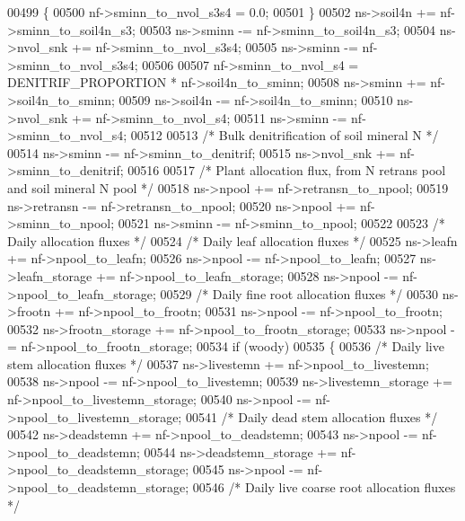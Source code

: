 \begin{DoxyCode}
{00499     \{
00500         nf->sminn\_to\_nvol\_s3s4 = 0.0;
00501     \}
00502     ns->soil4n     += nf->sminn\_to\_soil4n\_s3;
00503     ns->sminn      -= nf->sminn\_to\_soil4n\_s3;
00504     ns->nvol\_snk   += nf->sminn\_to\_nvol\_s3s4;
00505     ns->sminn      -= nf->sminn\_to\_nvol\_s3s4;
00506     
00507     nf->sminn\_to\_nvol\_s4 = DENITRIF\_PROPORTION * nf->soil4n\_to\_sminn;
00508     ns->sminn      += nf->soil4n\_to\_sminn;
00509     ns->soil4n     -= nf->soil4n\_to\_sminn;
00510     ns->nvol\_snk   += nf->sminn\_to\_nvol\_s4;
00511     ns->sminn      -= nf->sminn\_to\_nvol\_s4;
00512 
00513     \textcolor{comment}{/* Bulk denitrification of soil mineral N */}
00514     ns->sminn      -= nf->sminn\_to\_denitrif;
00515     ns->nvol\_snk   += nf->sminn\_to\_denitrif;
00516     
00517     \textcolor{comment}{/* Plant allocation flux, from N retrans pool and soil mineral N pool */}
00518     ns->npool      += nf->retransn\_to\_npool;
00519     ns->retransn   -= nf->retransn\_to\_npool;
00520     ns->npool      += nf->sminn\_to\_npool;
00521     ns->sminn      -= nf->sminn\_to\_npool;
00522         
00523     \textcolor{comment}{/* Daily allocation fluxes */}
00524     \textcolor{comment}{/* Daily leaf allocation fluxes */}
00525     ns->leafn          += nf->npool\_to\_leafn;
00526     ns->npool          -= nf->npool\_to\_leafn;
00527     ns->leafn\_storage  += nf->npool\_to\_leafn\_storage;
00528     ns->npool          -= nf->npool\_to\_leafn\_storage;
00529     \textcolor{comment}{/* Daily fine root allocation fluxes */}
00530     ns->frootn         += nf->npool\_to\_frootn;
00531     ns->npool          -= nf->npool\_to\_frootn;
00532     ns->frootn\_storage += nf->npool\_to\_frootn\_storage;
00533     ns->npool          -= nf->npool\_to\_frootn\_storage;
00534     \textcolor{keywordflow}{if} (woody)
00535     \{
00536         \textcolor{comment}{/* Daily live stem allocation fluxes */}
00537         ns->livestemn          += nf->npool\_to\_livestemn;
00538         ns->npool              -= nf->npool\_to\_livestemn;
00539         ns->livestemn\_storage  += nf->npool\_to\_livestemn\_storage;
00540         ns->npool              -= nf->npool\_to\_livestemn\_storage;
00541         \textcolor{comment}{/* Daily dead stem allocation fluxes */}
00542         ns->deadstemn          += nf->npool\_to\_deadstemn;
00543         ns->npool              -= nf->npool\_to\_deadstemn;
00544         ns->deadstemn\_storage  += nf->npool\_to\_deadstemn\_storage;
00545         ns->npool              -= nf->npool\_to\_deadstemn\_storage;
00546         \textcolor{comment}{/* Daily live coarse root allocation fluxes */}
}
\end{DoxyCode}
